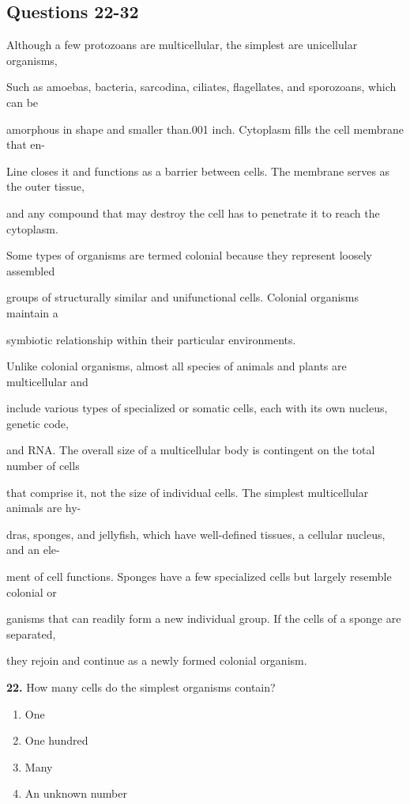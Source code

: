 \documentclass[12pt]{article}
\begin{document}
\subsection*{Questions 22-32}
\begingroup
\small
\sloppy
\setlength{\parskip}{0pt}
\setlength{\parindent}{0pt}
Although a few protozoans are multicellular, the simplest are unicellular organisms,\par
Such as amoebas, bacteria, sarcodina, ciliates, flagellates, and sporozoans, which can be\par
amorphous in shape and smaller than.001 inch. Cytoplasm fills the cell membrane that en-\par
Line closes it and functions as a barrier between cells. The membrane serves as the outer tissue,\par
and any compound that may destroy the cell has to penetrate it to reach the cytoplasm.\par
Some types of organisms are termed colonial because they represent loosely assembled\par
groups of structurally similar and unifunctional cells. Colonial organisms maintain a\par
symbiotic relationship within their particular environments.\par
Unlike colonial organisms, almost all species of animals and plants are multicellular and\par
include various types of specialized or somatic cells, each with its own nucleus, genetic code,\par
and RNA. The overall size of a multicellular body is contingent on the total number of cells\par
that comprise it, not the size of individual cells. The simplest multicellular animals are hy-\par
dras, sponges, and jellyfish, which have well-defined tissues, a cellular nucleus, and an ele-\par
ment of cell functions. Sponges have a few specialized cells but largely resemble colonial or\par
ganisms that can readily form a new individual group. If the cells of a sponge are separated,\par
they rejoin and continue as a newly formed colonial organism.\par
\endgroup
\medskip
\noindent\textbf{22.} How many cells do the simplest organisms contain?
\begin{enumerate}[label=(\Alph*),leftmargin=*,itemsep=0.2em]
\item One
\item One hundred
\item Many
\item An unknown number
\end{enumerate}
\end{document}
